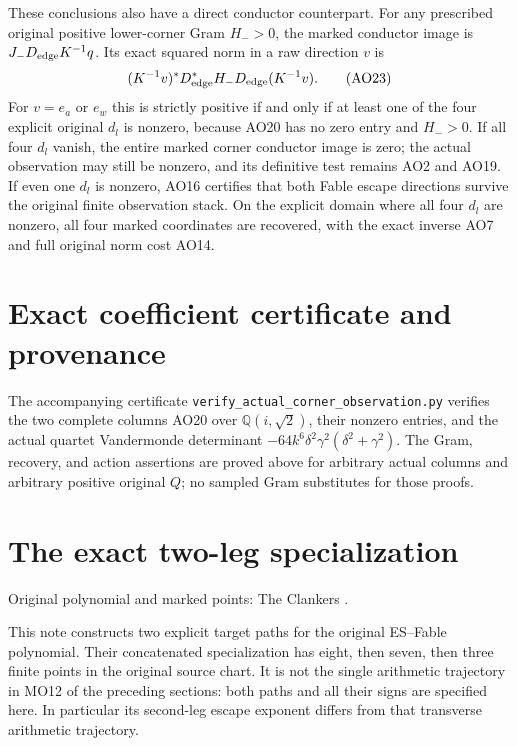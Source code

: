 \documentclass[11pt]{article}
\begin{document}
These conclusions also have a direct conductor counterpart.
For any prescribed original positive lower-corner Gram
$H_->0$, the marked conductor image is
$J_-D_{\rm edge}K^{-1}q$. Its exact squared norm in a raw
direction $v$ is
\begin{equation}
 (K^{-1}v)^*D_{\rm edge}^*H_-D_{\rm edge}(K^{-1}v).
 \tag{AO23}
\end{equation}
For $v=e_a$ or $e_w$ this is strictly positive if and only
if at least one of the four explicit original $d_l$ is
nonzero, because AO20 has no zero entry and $H_->0$.
If all four $d_l$ vanish, the entire marked corner conductor
image is zero; the actual observation may still be nonzero,
and its definitive test remains AO2 and AO19. If even one
$d_l$ is nonzero, AO16 certifies that both Fable escape
directions survive the original finite observation stack.
On the explicit domain where all four $d_l$ are nonzero,
all four marked coordinates are recovered, with the exact
inverse AO7 and full original norm cost AO14.

\section{Exact coefficient certificate and provenance}
The accompanying certificate
\texttt{verify\_actual\_corner\_observation.py} verifies
the two complete columns AO20 over $\mathbb Q(i,\sqrt2)$,
their nonzero entries, and the actual quartet Vandermonde
determinant $-64k^6\delta^2\gamma^2(\delta^2+\gamma^2)$.
The Gram, recovery, and action assertions are proved above
for arbitrary actual columns and arbitrary positive original
$Q$; no sampled Gram substitutes for those proofs.

\section{The exact two-leg specialization}
Original polynomial and marked points: The Clankers \cite{ES488}.


This note constructs two explicit target paths for the original
ES--Fable polynomial. Their concatenated specialization has
eight, then seven, then three finite points in the original
source chart. It is not the single arithmetic trajectory in
MO12 of the preceding sections: both paths and all their signs are
specified here. In particular its second-leg escape exponent
differs from that transverse arithmetic trajectory.
\end{document}
